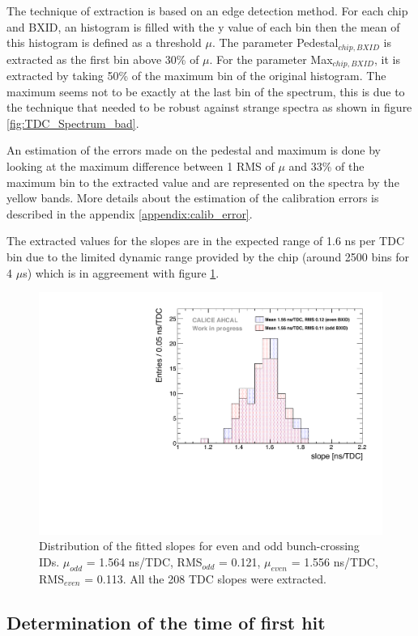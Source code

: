 The technique of extraction is based on an edge detection method. For each chip and BXID, an histogram is filled with the y value of each bin then the mean of this histogram is defined as a threshold $\mu$. The parameter Pedestal$_{chip, BXID}$ is extracted as the first bin above 30\% of $\mu$. For the parameter Max$_{chip, BXID}$, it is extracted by taking 50\% of the maximum bin of the original histogram. The maximum seems not to be exactly at the last bin of the spectrum, this is due to the technique that needed to be robust against strange spectra as shown in figure \ref{fig:TDC_Spectrum_bad}.

An estimation of the errors made on the pedestal and maximum is done by looking at the maximum difference between 1 RMS of $\mu$ and 33\% of the maximum bin to the extracted value and are represented on the spectra by the yellow bands. More details about the estimation of the calibration errors is described in the appendix \ref{appendix:calib_error}.

The extracted values for the slopes are in the expected range of 1.6 ns per TDC bin due to the limited dynamic range provided by the chip (around 2500 bins for 4 $\mu$s) which is in aggreement with figure \ref{fig:slope_time}.

\begin{figure}[htbp!]
	\centering
	\includegraphics[width=0.7\linewidth]{chap5/fig_AHCAL_timing/Muons/SlopesTDC}
	\caption{Distribution of the fitted slopes for even and odd bunch-crossing IDs. $\mu_{odd}$ = 1.564 ns/TDC, RMS$_{odd}$ = 0.121, $\mu_{even}$ = 1.556 ns/TDC, RMS$_{even}$ = 0.113. All the 208 TDC slopes were extracted.} \label{fig:slope_time}
\end{figure}

\subsection{Determination of the time of first hit}

